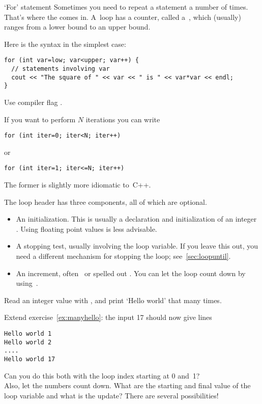 \begin{slide}{`For' statement}
  \label{sl:for}
  Sometimes you need to repeat a statement a number of times. That's
  where the  comes in. A~loop has a counter, called
  a~, which (usually) ranges from a lower bound
  to an upper bound.

  Here is the syntax in the simplest case:
\begin{verbatim}
for (int var=low; var<upper; var++) {
  // statements involving var
  cout << "The square of " << var << " is " << var*var << endl;
}
\end{verbatim}
\begin{cnote}
Use compiler flag .
\end{cnote}
\end{slide}

If you want to perform $N$ iterations you can write
\begin{verbatim}
for (int iter=0; iter<N; iter++)
\end{verbatim}
or
\begin{verbatim}
for (int iter=1; iter<=N; iter++)
\end{verbatim}
The former is slightly more idiomatic to~C++.

The loop header has three components, all of which are optional.
\begin{itemize}
\item An initialization. This is usually a declaration and
  initialization of an integer . Using
  floating point values is less advisable.
\item A stopping test, usually
  involving the loop variable. If you leave this out, you need a
  different mechanism for stopping the loop; see~\ref{sec:loopuntil}.
\item An increment, often~ or spelled out . You can let the loop count down by using~.
\end{itemize}

\begin{exercise}
  \label{ex:manyhello}
  Read an integer value with , and print `Hello world' that many times.
\end{exercise}
\begin{exercise}
  \label{ex:counthello}
  Extend exercise~\ref{ex:manyhello}: the input 17 should now give lines
\begin{verbatim}
Hello world 1
Hello world 2
....
Hello world 17
\end{verbatim}
Can you do this both with the loop index starting at 0 and~1?\\
Also, let the numbers count down. What are the starting and final
value of the loop variable and what is the update? There are several possibilities!
\end{exercise}

